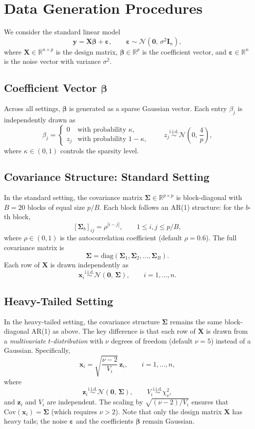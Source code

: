 \documentclass[11pt]{article}
\newcommand{\bX}{\bm{X}}
\newcommand{\by}{\bm{y}}
\newcommand{\bbeta}{\bm{\beta}}
\newcommand{\beps}{\bm{\varepsilon}}
\newcommand{\bSigma}{\bm{\Sigma}}
\newcommand{\bI}{\bm{I}}
\begin{document}
\section*{Data Generation Procedures}

We consider the standard linear model
\[
  \by = \bX \bbeta + \beps, \qquad \beps \sim \mathcal{N}(\bm{0},\, \sigma^2 \bI_n),
\]
where $\bX \in \mathbb{R}^{n \times p}$ is the design matrix, $\bbeta \in \mathbb{R}^p$ is the coefficient vector, and $\beps \in \mathbb{R}^n$ is the noise vector with variance $\sigma^2$.

\subsection*{Coefficient Vector $\bbeta$}

Across all settings, $\bbeta$ is generated as a sparse Gaussian vector. Each entry $\beta_j$ is independently drawn as
\[
  \beta_j =
  \begin{cases}
    0 & \text{with probability } \kappa, \\
    z_j & \text{with probability } 1 - \kappa,
  \end{cases}
  \qquad z_j \overset{\text{i.i.d.}}{\sim} \mathcal{N}\!\left(0,\, \frac{4}{p}\right),
\]
where $\kappa \in (0,1)$ controls the sparsity level.

\subsection*{Covariance Structure: Standard Setting}

In the standard setting, the covariance matrix $\bSigma \in \mathbb{R}^{p \times p}$ is block-diagonal with $B = 20$ blocks of equal size $p/B$. Each block follows an AR(1) structure: for the $b$-th block,
\[
  [\bSigma_b]_{ij} = \rho^{|i - j|}, \qquad 1 \le i, j \le p/B,
\]
where $\rho \in (0,1)$ is the autocorrelation coefficient (default $\rho = 0.6$). The full covariance matrix is
\[
  \bSigma = \mathrm{diag}(\bSigma_1, \bSigma_2, \ldots, \bSigma_B).
\]
Each row of $\bX$ is drawn independently as
\[
  \bm{x}_i \overset{\text{i.i.d.}}{\sim} \mathcal{N}(\bm{0},\, \bSigma), \qquad i = 1, \ldots, n.
\]

\subsection*{Heavy-Tailed Setting}

In the heavy-tailed setting, the covariance structure $\bSigma$ remains the same block-diagonal AR(1) as above. The key difference is that each row of $\bX$ is drawn from a \emph{multivariate $t$-distribution} with $\nu$ degrees of freedom (default $\nu = 5$) instead of a Gaussian. Specifically,
\[
  \bm{x}_i = \sqrt{\frac{\nu - 2}{V_i}}\, \bm{z}_i, \qquad i = 1, \ldots, n,
\]
where
\[
  \bm{z}_i \overset{\text{i.i.d.}}{\sim} \mathcal{N}(\bm{0},\, \bSigma), \qquad V_i \overset{\text{i.i.d.}}{\sim} \chi^2_\nu,
\]
and $\bm{z}_i$ and $V_i$ are independent. The scaling by $\sqrt{(\nu-2)/V_i}$ ensures that $\mathrm{Cov}(\bm{x}_i) = \bSigma$ (which requires $\nu > 2$). Note that only the design matrix $\bX$ has heavy tails; the noise $\beps$ and the coefficients $\bbeta$ remain Gaussian.
\end{document}
